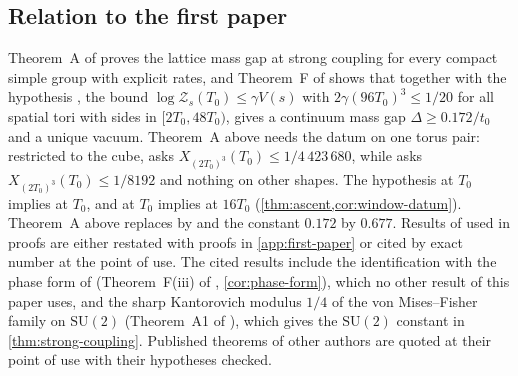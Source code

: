 \documentclass[11pt,a4paper]{amsart}
\theoremstyle{definition}
\theoremstyle{remark}
\numberwithin{equation}{section}
\newcommand{\SU}{\mathrm{SU}}              %
\newcommand{\TT}{\mathbb{T}}               %
\newcommand{\Zc}{\mathcal{Z}}              %
\newcommand{\Zs}[2]{\Zc_{#1}(#2)}          %
\newcommand{\XT}[2]{X_{#1}(#2)}            %
\newcommand{\Vol}[1]{V(#1)}                %
\newcommand{\cube}[1]{(2#1)^3}             %
\newcommand{\xconst}{\frac{1}{8192}}       %
\newcommand{\xconstinl}{1/8192}            %
\newcommand{\Bcirc}{\text{\upshape(B$^{\circ}$)}}   %
\newcommand{\Bstar}{\text{\upshape(B$^{*}$)}}       %
\newcommand{\hypW}{\text{\upshape(W)}}              %
\newcommand{\UVB}{\text{\upshape(UVB)}}             %
\newcommand{\tzero}{t_0}                   %
\newcommand{\Tzero}{T_0}                   %
\begin{document}
\subsection{Relation to the first paper}
Theorem~A of \cite{bhattacharjee2026first} proves the lattice mass gap at strong coupling for every compact simple group with explicit rates, and Theorem~F of \cite{bhattacharjee2026first} shows that \hypW{} together with the hypothesis \Bstar, the bound $\log\Zs{s}{T_0}\le\gamma\Vol{s}$ with $2\gamma(96T_0)^3\le1/20$ for all spatial tori with sides in $[2T_0,48T_0)$, gives a continuum mass gap $\Delta\ge0.172/\tzero$ and a unique vacuum. Theorem~A above needs the datum on one torus pair: restricted to the cube, \Bstar{} asks $\XT{\cube{T_0}}{T_0}\le1/4\,423\,680$, while \Bcirc{} asks $\XT{\cube{T_0}}{T_0}\le\xconstinl$ and nothing on other shapes. The hypothesis \Bstar{} at $\Tzero$ implies \Bcirc{} at $\Tzero$, and \Bcirc{} at $\Tzero$ implies \Bstar{} at $16\Tzero$ (\cref{thm:ascent,cor:window-datum}). Theorem~A above replaces \hypW{} by \UVB{} and the constant $0.172$ by $0.677$. Results of \cite{bhattacharjee2026first} used in proofs are either restated with proofs in \cref{app:first-paper} or cited by exact number at the point of use. The cited results include the identification with the phase form of \hypW{} (Theorem~F(iii) of \cite{bhattacharjee2026first}, \cref{cor:phase-form}), which no other result of this paper uses, and the sharp Kantorovich modulus $1/4$ of the von Mises--Fisher family on $\SU(2)$ (Theorem~A1 of \cite{bhattacharjee2026first}), which gives the $\SU(2)$ constant in \cref{thm:strong-coupling}. Published theorems of other authors are quoted at their point of use with their hypotheses checked.
\end{document}
